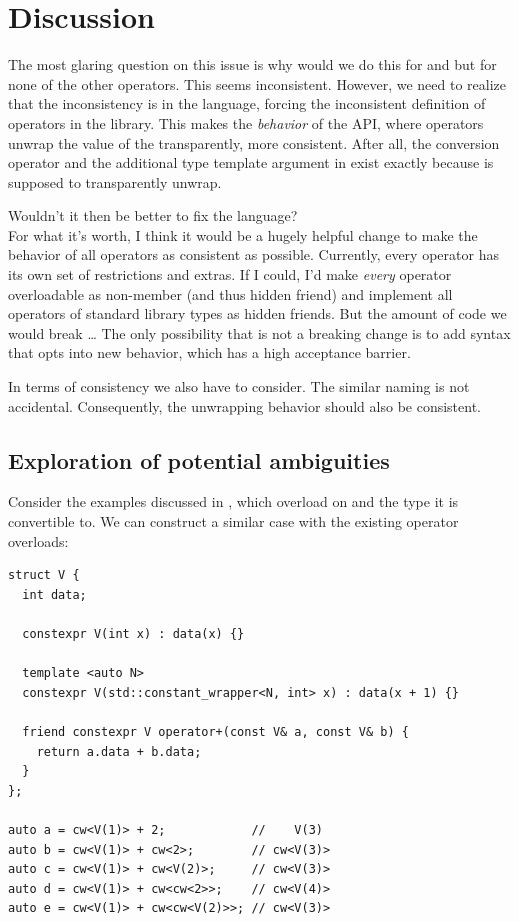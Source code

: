 \section{Discussion}

The most glaring question on this issue is why would we do this for  and
 but for none of the other operators.
This seems inconsistent.
However, we need to realize that the inconsistency is in the language, forcing the inconsistent
definition of operators in the library.
This makes the \emph{behavior} of the API, where operators unwrap the value of the
 transparently, more consistent.
After all, the conversion operator and the additional type template argument in
 exist exactly because  is supposed to transparently
unwrap.

Wouldn't it then be better to fix the language?\\
For what it's worth, I think it would be a hugely helpful change to make the behavior of all
operators as consistent as possible.
Currently, every operator has its own set of restrictions and extras.
If I could, I'd make \emph{every} operator overloadable as non-member (and thus hidden friend) and
implement all operators of standard library types as hidden friends.
But the amount of code we would break \ldots{}
The only possibility that is not a breaking change is to add syntax that opts into new behavior,
which has a high acceptance barrier.

In terms of consistency we also have \std{} to consider.
The similar naming is not accidental.
Consequently, the unwrapping behavior should also be consistent.

\subsection{Exploration of potential ambiguities}

Consider the examples discussed in \textcite{P3792R0}, which overload on  and
the type it is convertible to.
We can construct a similar case with the existing  operator overloads:
\medskip\begin{lstlisting}
struct V {
  int data;

  constexpr V(int x) : data(x) {}

  template <auto N>
  constexpr V(std::constant_wrapper<N, int> x) : data(x + 1) {}

  friend constexpr V operator+(const V& a, const V& b) {
    return a.data + b.data;
  }
};

auto a = cw<V(1)> + 2;            //    V(3)
auto b = cw<V(1)> + cw<2>;        // cw<V(3)>
auto c = cw<V(1)> + cw<V(2)>;     // cw<V(3)>
auto d = cw<V(1)> + cw<cw<2>>;    // cw<V(4)>
auto e = cw<V(1)> + cw<cw<V(2)>>; // cw<V(3)>
\end{lstlisting}

